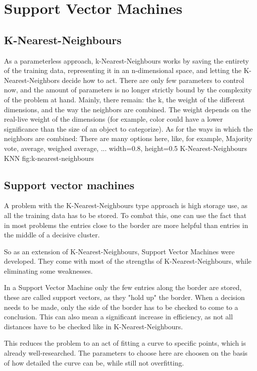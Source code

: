 \section{Support Vector Machines}
\label{sec:SVM}
\subsection{K-Nearest-Neighbours}
As a parameterless approach, k-Nearest-Neighbours works by saving the entirety of the training data, representing it in an n-dimensional space, and letting the K-Nearest-Neighbors decide how to act. There are only few parameters to control now, and the amount of parameters is no longer strictly bound by the complexity of the problem at hand. Mainly, there remain: the k, the weight of the different dimensions, and the way the neighbors are combined. 
The weight depends on the real-live weight of the dimensions (for example, color could have a lower significance than the size of an object to categorize).
As for the ways in which the neighbors are combined: There are many options here, like, for example, Majority vote, average, weighed average, ...
    {width=0.8\textwidth, height=0.5\textheight} %
    {K-Nearest-Neighbours}   %
    {KNN}   %
    {fig:k-nearest-neighbours}    %

\subsection{Support vector machines}
A problem with the K-Nearest-Neighbours type approach is high storage use, as all the training data has to be stored. To combat this, one can use the fact that in most problems the entries close to the border are more helpful than entries in the middle of a decisive cluster.

So as an extension of K-Nearest-Neighbours, Support Vector Machines were developed. They come with most of the strengths of K-Nearest-Neighbours, while eliminating some weaknesses.

In a Support Vector Machine only the few entries along the border are stored, these are called support vectors, as they "hold up" the border. When a decision needs to be made, only the side of the border has to be checked to come to a conclusion. This can also mean a significant increase in efficiency, as not all distances have to be checked like in K-Nearest-Neighbours.

This reduces the problem to an act of fitting a curve to specific points, which is already well-researched. The parameters to choose here are choosen on the basis of how detailed the curve can be, while still not overfitting.

